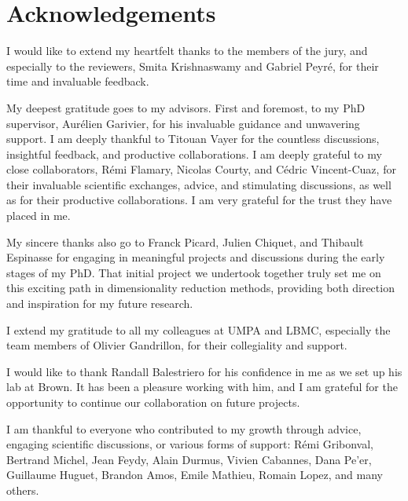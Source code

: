 \chapter*{Acknowledgements}\label{cha:ack}

I would like to extend my heartfelt thanks to the members of the jury, and especially to the reviewers, Smita Krishnaswamy and Gabriel Peyré, for their time and invaluable feedback.

My deepest gratitude goes to my advisors. First and foremost, to my PhD supervisor, Aurélien Garivier, for his invaluable guidance and unwavering support. I am deeply thankful to Titouan Vayer for the countless discussions, insightful feedback, and productive collaborations. I am deeply grateful to my close collaborators, Rémi Flamary, Nicolas Courty, and Cédric Vincent-Cuaz, for their invaluable scientific exchanges, advice, and stimulating discussions, as well as for their productive collaborations. I am very grateful for the trust they have placed in me.

My sincere thanks also go to Franck Picard, Julien Chiquet, and Thibault Espinasse for engaging in meaningful projects and discussions during the early stages of my PhD. That initial project we undertook together truly set me on this exciting path in dimensionality reduction methods, providing both direction and inspiration for my future research.

I extend my gratitude to all my colleagues at UMPA and LBMC, especially the team members of Olivier Gandrillon, for their collegiality and support.

I would like to thank Randall Balestriero for his confidence in me as we set up his lab at Brown. It has been a pleasure working with him, and I am grateful for the opportunity to continue our collaboration on future projects.

I am thankful to everyone who contributed to my growth through advice, engaging scientific discussions, or various forms of support: Rémi Gribonval, Bertrand Michel, Jean Feydy, Alain Durmus, Vivien Cabannes, Dana Pe'er, Guillaume Huguet, Brandon Amos, Emile Mathieu, Romain Lopez, and many others.

\newpage